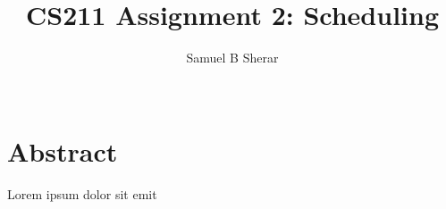 \documentclass{acm_proc_article-sp}
\begin{document}
\title{CS211 Assignment 2: Scheduling}
\author{
  \alignauthor 
  Samuel B Sherar\\
  \
}
\maketitle

\section{Abstract}
Lorem ipsum dolor sit emit
\end{document}
